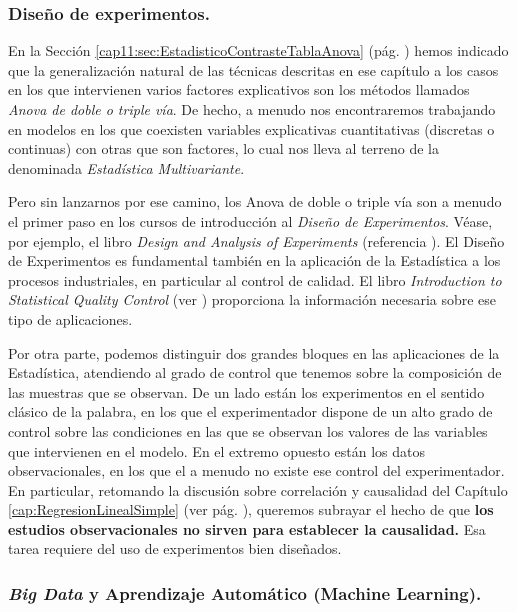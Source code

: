 \subsubsection*{Diseño de experimentos.}

En la Sección \ref{cap11:sec:EstadisticoContrasteTablaAnova} (pág. \pageref{cap11:sec:EstadisticoContrasteTablaAnova}) hemos indicado que la generalización natural de las técnicas descritas en ese capítulo a los casos en los que intervienen varios factores explicativos son los métodos llamados {\em Anova de doble o triple vía}. De hecho, a menudo nos encontraremos trabajando en modelos en los que coexisten variables explicativas cuantitativas (discretas o continuas) con otras que son factores, lo  cual nos lleva al terreno de la denominada {\em Estadística Multivariante}.

Pero sin lanzarnos por ese camino, los Anova de doble o triple vía son a menudo el primer paso en los cursos de introducción al {\em Diseño de Experimentos}. Véase, por  ejemplo, el libro {\em Design and Analysis of Experiments} (referencia \cite{deanVoss1999design}). El Diseño de Experimentos es fundamental también en la aplicación de la Estadística a los procesos industriales, en particular al control de calidad. El libro {\em Introduction to Statistical Quality Control} (ver \cite{montgomery2007introduction}) proporciona la información necesaria sobre ese tipo de aplicaciones.

Por otra parte, podemos distinguir dos grandes bloques en las aplicaciones de la Estadística, atendiendo al grado de control que tenemos sobre la composición de las muestras que se observan. De un lado están los experimentos en el sentido clásico de la palabra, en los que el experimentador dispone de un alto grado de control sobre las condiciones en las que se observan los valores de las variables que intervienen en el modelo. En el extremo opuesto están los datos observacionales, en los que el a menudo no existe ese control del experimentador. En particular, retomando la discusión sobre correlación y causalidad  del Capítulo \ref{cap:RegresionLinealSimple} (ver pág. \pageref{cap10:subsubsec:CorrelacionVsCausalidad}), queremos subrayar el hecho de que {\bf los estudios observacionales no sirven para establecer la causalidad.} Esa tarea requiere del uso de experimentos bien diseñados.


\subsubsection*{{\em Big Data} y Aprendizaje Automático (Machine Learning).}

